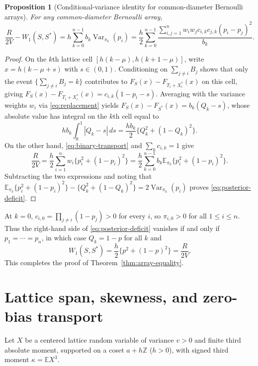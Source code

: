 \documentclass[11pt]{article}
\numberwithin{equation}{section}
\newtheorem{proposition}[theorem]{Proposition}
\theoremstyle{remark}
\DeclareMathOperator{\Var}{Var}
\newcommand{\E}{\mathbb E}
\newcommand{\Z}{\mathbb Z}
\begin{document}
\begin{proposition}[Conditional-variance identity for common-diameter Bernoulli arrays]\label{prop:posterior}
For any common-diameter Bernoulli array,
\begin{equation}\label{eq:posterior-deficit}
 \frac R{2V}-W_1(S,S^*)
       =h\sum_{k=0}^{n-1}b_k\Var_{\pi_k}(p_i)
       =\frac h2\sum_{k=0}^{n-1}
          \frac{\sum_{i,j=1}^nw_iw_jc_{i,k}c_{j,k}(p_i-p_j)^2}{b_k}.
\end{equation}
\end{proposition}
\begin{proof}
On the $k$th lattice cell $[h(k-\mu),h(k+1-\mu)]$, write $x=h(k-\mu+s)$ with
$s\in(0,1)$. Conditioning on $\sum_{j\ne i}B_j$ shows that only the event
$\{\sum_{j\ne i}B_j=k\}$ contributes to $F_S(x)-F_{T_i+X_i^*}(x)$ on this
cell, giving $F_S(x)-F_{T_i+X_i^*}(x)=c_{i,k}(1-p_i-s)$. Averaging with the
variance weights $w_i$ via \eqref{eq:replacement} yields
$F_S(x)-F_{S^*}(x)=b_k(Q_k-s)$, whose absolute value has integral on the $k$th
cell equal to
\[
 h b_k\int_0^1|Q_k-s|\,ds=\frac{h b_k}2\bigl\{Q_k^2+(1-Q_k)^2\bigr\}.
\]
On the other hand, \eqref{eq:binary-transport} and $\sum_k c_{i,k}=1$ give
\[
 \frac R{2V}=\frac h2\sum_{i=1}^nw_i\bigl\{p_i^2+(1-p_i)^2\bigr\}
            =\frac h2\sum_{k=0}^{n-1}b_k\E_{\pi_k}\bigl\{p_i^2+(1-p_i)^2\bigr\}.
\]
Subtracting the two expressions and noting that
$\E_{\pi_k}\{p_i^2+(1-p_i)^2\}-\{Q_k^2+(1-Q_k)^2\}=2\Var_{\pi_k}(p_i)$
proves \eqref{eq:posterior-deficit}.
\end{proof}

At $k=0$, $c_{i,0}=\prod_{j\ne i}(1-p_j)>0$ for every $i$, so $\pi_{i,0}>0$
for all $1\le i\le n$. Thus the right-hand side of \eqref{eq:posterior-deficit}
vanishes if and only if $p_1=\cdots=p_n$, in which case $Q_k=1-p$ for all $k$
and
\begin{equation}\label{eq:iid-transport}
                      W_1(S,S^*)=\frac h2\bigl\{p^2+(1-p)^2\bigr\}=\frac{R}{2V}.
\end{equation}
This completes the proof of Theorem~\ref{thm:array-equality}.

\section{Lattice span, skewness, and zero-bias transport}\label{sec:lattice}

Let $X$ be a centered lattice random variable of variance $v>0$ and finite
third absolute moment, supported on a coset $a+h\Z$ ($h>0$), with signed
third moment $\kappa=\E X^3$.
\end{document}
